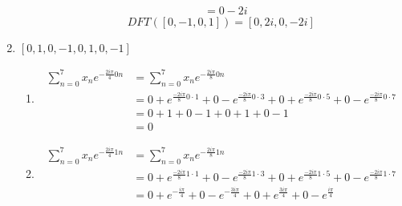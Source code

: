 \documentclass{article}
\begin{document}
\begin{enumerate}[label=\Alph*)]
\begin{enumerate}[label={k=\arabic*}, start=0]
\begin{align*}
                                                                     & = 0 - 2i
                    \end{align*}
                    \begin{equation*}
                        DFT([0, -1, 0, 1]) = [0, 2i, 0, -2i]
                    \end{equation*}
          \end{enumerate}
    \item \pagebreak \([0, 1, 0, -1, 0, 1, 0, -1]\)
          \begin{enumerate}[label={k=\arabic*}, start=0]
              \item \begin{align*}
                        \sum_{n=0}^{7}{x_n e^{-\frac{2 i \pi}{4}0n}} & = \sum_{n=0}^{7}{x_n e^{-\frac{2 i \pi}{8}0n}}                                                                                                              \\
                                                                     & = 0 + e^{\frac{-2 i \pi}{8} 0 \cdot 1} + 0 - e^{\frac{-2 i \pi}{8} 0 \cdot 3} + 0 + e^{\frac{-2 i \pi}{8} 0 \cdot 5} + 0 - e^{\frac{-2 i \pi}{8} 0 \cdot 7} \\
                                                                     & = 0 + 1 + 0 - 1 + 0 + 1 + 0 - 1                                                                                                                             \\
                                                                     & = 0
                    \end{align*}
              \item \begin{align*}
                        \sum_{n=0}^{7}{x_n e^{-\frac{2 i \pi}{4}1n}} & = \sum_{n=0}^{7}{x_n e^{-\frac{2 i \pi}{8}1n}}                                                                                                              \\
                                                                     & = 0 + e^{\frac{-2 i \pi}{8} 1 \cdot 1} + 0 - e^{\frac{-2 i \pi}{8} 1 \cdot 3} + 0 + e^{\frac{-2 i \pi}{8} 1 \cdot 5} + 0 - e^{\frac{-2 i \pi}{8} 1 \cdot 7} \\
                                                                     & = 0 + e^{-\frac{i \pi}{4}} + 0 - e^{-\frac{3 i \pi}{4}} + 0 + e^{\frac{3 i \pi}{4}} + 0 - e^{\frac{i \pi}{4}}                                               \\

\end{align*}
\end{enumerate}
\end{enumerate}
\end{document}
